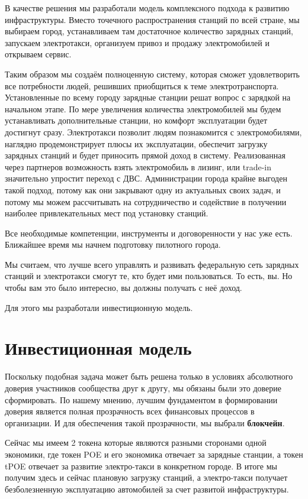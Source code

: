 \documentclass[a4paper,12pt]{report}
\begin{document}
В качестве решения мы разработали модель комплексного подхода к развитию инфраструктуры. Вместо точечного распространения станций по всей стране, мы выбираем город, устанавливаем там достаточное количество зарядных станций, запускаем электротакси, организуем привоз и продажу электромобилей и открываем сервис. 

Таким образом мы создаём полноценную систему, которая сможет удовлетворить все потребности людей, решивших приобщиться к теме электротранспорта. Установленные по всему городу зарядные станции решат вопрос с зарядкой на начальном этапе. По мере увеличения количества электромобилей мы будем устанавливать дополнительные станции, но комфорт эксплуатации будет достигнут сразу. Электротакси позволит людям познакомится с электромобилями, наглядно продемонстрирует плюсы их эксплуатации, обеспечит загрузку зарядных станций и будет приносить прямой доход в систему. Реализованная через партнеров возможность взять электромобиль в лизинг, или trade-in значительно упростит переход с ДВС. Администрации города крайне выгоден такой подход, потому как они закрывают одну из актуальных своих задач, и потому мы можем рассчитывать на сотрудничество и содействие в получении наиболее привлекательных мест под установку станций. 

Все необходимые компетенции, инструменты и договоренности у нас уже есть. Ближайшее время мы начнем подготовку пилотного города. 

Мы считаем, что лучше всего управлять и развивать федеральную сеть зарядных станций и электротакси смогут те, кто будет ими пользоваться. То есть, вы. Но чтобы вам это было интересно, вы должны получать с неё доход. 

Для этого мы разработали инвестиционную модель. 





\chapter{Инвестиционная модель}
Поскольку подобная задача может быть решена только в условиях абсолютного доверия участников сообщества друг к другу, мы обязаны были это доверие сформировать. По нашему мнению, лучшим фундаментом в формировании доверия является полная прозрачность всех финансовых процессов в организации. И для обеспечения такой прозрачности, мы выбрали \textbf{блокчейн}. 

Сейчас мы имеем 2 токена которые являются разными сторонами одной экономики, где
токен POE и его экономика отвечает за зарядные станции, а токен tPOE отвечает за развитие электро-такси в конкретном городе. В итоге мы получим здесь и сейчас плановую загрузку станций, а электро-такси получает безболезненную эксплуатацию автомобилей за счет развитой инфраструктуры. 
\end{document}
